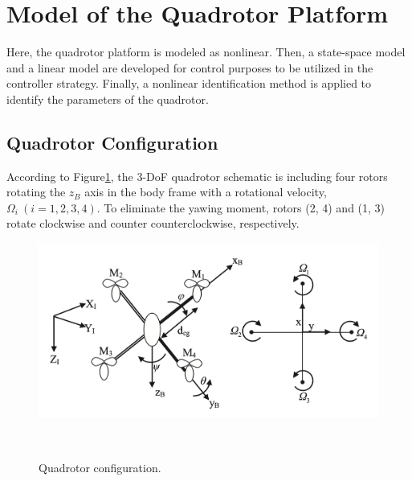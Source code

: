 \documentclass[3p]{elsarticle}
\begin{document}
 \section{Model of the Quadrotor Platform}\label{sec:modeling}
 \noindent Here, the quadrotor platform is modeled as nonlinear.
 Then, a state-space model and a linear model are developed for control purposes to be utilized in the controller strategy.
 Finally, a nonlinear identification method is applied to identify the parameters of the quadrotor.
 \subsection{Quadrotor Configuration}
 \noindent According to Figure\ref{fig:schematic}, the 3-DoF quadrotor schematic is including four rotors rotating the $z_B$ axis in the body frame with a rotational velocity, $\Omega_i~(i=1, 2, 3, 4)$. To eliminate the yawing moment, rotors (2, 4) and (1, 3) rotate clockwise and counter counterclockwise, respectively.

\begin{figure}[H]
    \centering
    \includegraphics[width=12cm]{../Figure/schematic.png}
    \caption{Quadrotor configuration.}
~\label{fig:schematic}
\end{figure}
\end{document}
